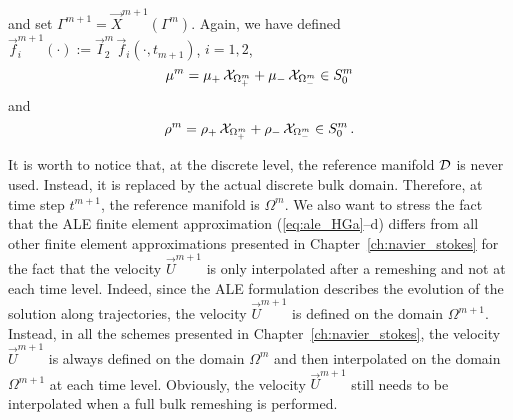and set $\Gamma^{m+1} = \vec X^{m+1}(\Gamma^m)$. Again, we have defined
$\vec f_i^{m+1}(\cdot) := \vec I^m_2\,\vec f_i(\cdot,t_{m+1})$, $i=1,2$,
\begin{equation}
\mu^m = \mu_+\,\mathrm{\mathcal{X}}_{\Omega^m_+} + \mu_-\,\mathrm{\mathcal{X}}_{\Omega^m_-}\in S^m_0
\end{equation}
and
\begin{equation}
\rho^m = \rho_+\,\mathrm{\mathcal{X}}_{\Omega^m_+} + \rho_-\,\mathrm{\mathcal{X}}_{\Omega^m_-}\in S^m_0\,.
\end{equation}

It is worth to notice that, at the discrete level, the reference manifold $\mathcal D$
is never used. Instead, it is replaced by the actual discrete bulk domain.
Therefore, at time step $t^{m+1}$, the reference manifold is $\Omega^m$. We
also want to stress the fact that the ALE finite element approximation
(\ref{eq:ale_HGa}--d) differs from all other finite element approximations
presented in Chapter~\ref{ch:navier_stokes} for the fact that the velocity $\vec
U^{m+1}$ is only interpolated after a remeshing and not at each time level.
Indeed, since the ALE formulation describes the evolution of the solution along
trajectories, the velocity $\vec U^{m+1}$ is defined on the domain
$\Omega^{m+1}$. Instead, in all the schemes presented in
Chapter~\ref{ch:navier_stokes}, the velocity $\vec U^{m+1}$ is always defined on
the domain $\Omega^m$ and then interpolated on the domain $\Omega^{m+1}$ at
each time level. Obviously, the velocity $\vec U^{m+1}$ still needs to be
interpolated when a full bulk remeshing is performed.

